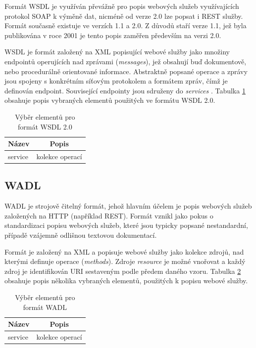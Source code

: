 \documentclass[czech,DP]{thesiskiv}
\begin{document}
Formát WSDL je využíván převážně pro popis webových služeb využívajících protokol SOAP k výměně dat, nicméně od verze 2.0 lze popsat i REST služby. Formát současně existuje ve verzích 1.1 a 2.0. Z důvodů staří verze 1.1, jež byla publikována v roce 2001 je tento popis zaměřen především na verzi 2.0. 

WSDL je formát založený na XML popisující webové služby jako množiny endpointů operujících nad zprávami (\textit{messages}), jež obsahují buď dokumentově, nebo procedurálně orientované informace. Abstraktně popsané operace a zprávy jsou spojeny s konkrétním síťovým protokolem a formátem zpráv, čímž je definován endpoint. Související endpointy jsou sdruženy do \textit{services} \cite{wsdl2}. Tabulka \ref{tab:wsdl-elements} obsahuje popis vybraných elementů použitých ve formátu WSDL 2.0.

\begin{table}[h]
	\centering
	\begin{tabular}{|l|c|}
		\hline
		Název & Popis \\
		\hline
		\hline
		service & kolekce operací \\
		\hline
	\end{tabular}
	\caption{Výběr elementů pro formát WSDL 2.0}
	\label{tab:wsdl-elements} 
\end{table}
 
\subsection{WADL}

WADL je strojově čitelný formát, jehož hlavním účelem je popis webových služeb založených na HTTP (například REST). Formát vznikl jako pokus o standardizaci popisu webových služeb, které jsou typicky popsané nestandardní, případě vzájemně odlišnou textovou dokumentací\cite{wadlSpec}.

Formát je založený na XML a popisuje webové služby jako kolekce zdrojů, nad kterými definuje operace (\textit{methods}). Zdroje \textit{resource} je možné vnořovat a každý zdroj je identifikován URI sestaveným podle předem daného vzoru. Tabulka \ref{tab:wadl-elements} obsahuje popis několika vybraných elementů, použitých k popisu webové služby.

\begin{table}[h]
	\centering
	\begin{tabular}{|l|c|}
		\hline
		Název & Popis \\
		\hline
		\hline
		service & kolekce operací \\
		\hline
	\end{tabular}
	\caption{Výběr elementů pro formát WADL}
	\label{tab:wadl-elements} 
\end{table}
 
\end{document}
